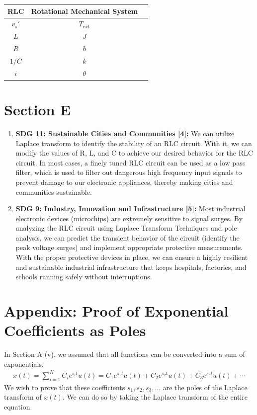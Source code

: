 \begin{enumerate}
    \begin{tabular}{|c|c|c|}
        \hline
        RLC & Rotational Mechanical System \\
        \hline
        $v_s'$ & $T_{ext}$ \\
        \hline
        $L$ & $J$ \\
        \hline
        $R$ & $b$ \\
        \hline
        $1/C$ & $k$ \\
        \hline
        $i$ & $\theta$ \\
        \hline
    \end{tabular}
\end{enumerate}

\section{Section E}
\begin{enumerate}
    \item \textbf{SDG 11: Sustainable Cities and Communities [4]: } We can utilize Laplace transform to identify the stability of an RLC circuit. With it, we can modify the values of R, L, and C to achieve our desired behavior for the RLC circuit. In most cases, a finely tuned RLC circuit can be used as a low pass filter, which is used to filter out dangerous high frequency input signals to prevent damage to our electronic appliances, thereby making cities and communities sustainable.
    \item \textbf{SDG 9: Industry, Innovation and Infrastructure [5]: } Most industrial electronic devices (microchips) are extremely sensitive to signal surges. By analyzing the RLC circuit using Laplace Transform Techniques and pole analysis, we can predict the transient behavior of the circuit (identify the peak voltage surges) and implement appropriate protective measurements. With the proper protective devices in place, we can ensure a highly resilient and sustainable industrial infrastructure that keeps hospitals, factories, and schools running safely without interruptions.
\end{enumerate}

\newpage
\section{Appendix: Proof of Exponential Coefficients as Poles}
\label{sec:appendix}

In Section A (v), we assumed that all functions can be converted into a sum of exponentials.
\begin{align*}
    x(t) = \sum_{i=1}^{N} C_i e^{s_i t} u(t) = C_1 e^{s_1 t} u(t) + C_2 e^{s_2 t} u(t) + C_3 e^{s_3 t} u(t) + \cdots
\end{align*}
We wish to prove that these coefficients $s_1, s_2, s_3, \dots$ are the poles of the Laplace transform of $x(t)$. We can do so by taking the Laplace transform of the entire equation.

